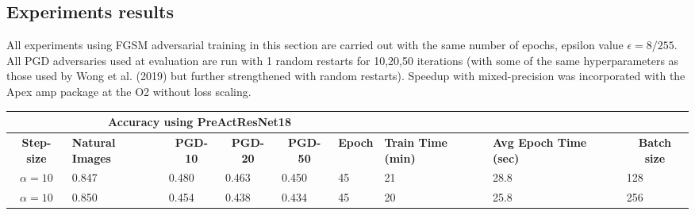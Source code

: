 \documentclass{article}
\begin{document}
\subsection{Experiments results}

All experiments using FGSM adversarial training in this section are carried out with the same number of epochs, epsilon value $\epsilon = 8/255$. All PGD adversaries used at
evaluation are run with 1 random restarts for 10,20,50 iterations (with some of the same hyperparameters as those
used by Wong et al. (2019) but further strengthened with random restarts). Speedup with mixed-precision was incorporated with the Apex amp package at the O2 without loss scaling.

\begin{center}
\begin{table}[hbt!]
\begin{tabular}{|c|l|l|l|l|l|l|l|l|}
\hline
\multicolumn{1}{|l|}{{ }} & \multicolumn{4}{c|}{{ \textbf{Accuracy using PreActResNet18}}}                                                                                                                                                                            & \multicolumn{4}{l|}{{ }}                                                                                                                                                                                                                         \\ \hline
{ \textbf{Step-size}}     & \multicolumn{1}{p{1.5cm}|}{{ \textbf{Natural Images}}} & \multicolumn{1}{c|}{{ \textbf{PGD-10}}} & \multicolumn{1}{c|}{{ \textbf{PGD-20}}} & \multicolumn{1}{c|}{{ \textbf{PGD-50}}} & \multicolumn{1}{c|}{{ \textbf{Epoch}}} & \multicolumn{1}{p{1.5cm}|}{{ \textbf{Train Time (min)}}} & \multicolumn{1}{p{1.5cm}|}{{ \textbf{Avg Epoch Time (sec)}}} & \multicolumn{1}{c|}{{ \textbf{Batch size}}} \\ \hline
{ $\alpha = 10$}       & { 0.847}                                        & { 0.480}                                & { 0.463}                                & { 0.450}                                & { 45}                                  & { 21 }                               & { 28.8 }                                & { 128}                                      \\ \hline
{ $\alpha = 10$}       & { 0.850}                                        & { 0.454}                                & { 0.438}                                & { 0.434}                                & { 45}                                  & { 20 }                               & { 25.8 }                                 & { 256}                                      \\ \hline

\end{tabular}
\end{table}
\end{center}
\end{document}
